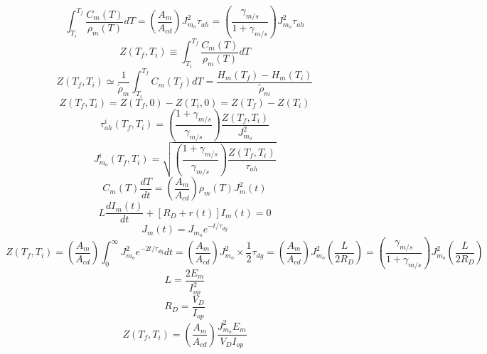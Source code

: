 \begin{equation}%
\int_{T_i}^{T_f}\frac{C_m(T)}{\rho_m(T)}dT=\left(\frac{A_m}{A_{cd}}\right)J_{m_o}^{2}\tau_{ah} 
=\left(\frac{\gamma_{m/s}}{1+\gamma_{m/s}}\right)J_{m_o}^{2}\tau_{ah}
\end{equation}
\begin{equation}%
Z(T_f,T_i)\equiv\int_{T_i}^{T_f}\frac{C_m(T)}{\rho_m(T)}dT
\end{equation}
\begin{equation}%
Z(T_f,T_i)\simeq\frac{1}{\tilde{\rho}_m}\int_{T_i}^{T_f}C_m(T_f)dT=\frac{H_m(T_f)-H_m(T_i)}{\tilde{\rho}_m}
\end{equation}
\begin{equation}%
Z(T_f,T_i)=Z(T_f,0)-Z(T_i,0)=Z(T_f)-Z(T_i)
\end{equation}
\begin{equation}%
\tau_{ah}^{i}(T_f,T_i)=\left(\frac{1+\gamma_{m/s}}{\gamma_{m/s}}\right)\frac{Z(T_f,T_i)}{J_{m_o}^{2}}
\end{equation}
\begin{equation}%
J_{m_o}^{i}(T_f,T_i)=\sqrt{\left(\frac{1+\gamma_{m/s}}{\gamma_{m/s}}\right)\frac{Z(T_f,T_i)}{\tau_{ah}}}
\end{equation}
\begin{equation}%
C_m(T)\frac{dT}{dt}=\left(\frac{A_m}{A_{cd}}\right)\rho_m(T)J_{m}^{2}(t)
\end{equation}
\begin{equation}%
L\frac{dI_m(t)}{dt}+[R_D+r(t)]I_m(t)=0
\end{equation}
\begin{equation}%
J_m(t)=J_{m_o}e^{-t/\tau_{dg}}
\end{equation}
\begin{equation}%
Z(T_f,T_i)=\left(\frac{A_m}{A_{cd}}\right)\int_{0}^{\infty}J_{m_o}^{2}e^{-2t/\tau_{dg}}dt=\left(\frac{A_m}{A_{cd}}\right)J_{m_o}^{2}\times\frac{1}{2}\tau_{dg} 
=\left(\frac{A_m}{A_{cd}}\right)J_{m_o}^{2}\left(\frac{L}{2R_D}\right) 
=\left(\frac{\gamma_{m/s}}{1+\gamma_{m/s}}\right)J_{m_o}^{2}\left(\frac{L}{2R_D}\right)
\end{equation}
\begin{equation}%
L=\frac{2E_m}{I_{op}^{2}}
\end{equation}
\begin{equation}%
R_D=\frac{V_D}{I_{op}}
\end{equation}
\begin{equation}%
Z(T_f,T_i)=\left(\frac{A_m}{A_{cd}}\right)\frac{J_{m_o}^{2}E_m}{V_DI_{op}}
\end{equation}
